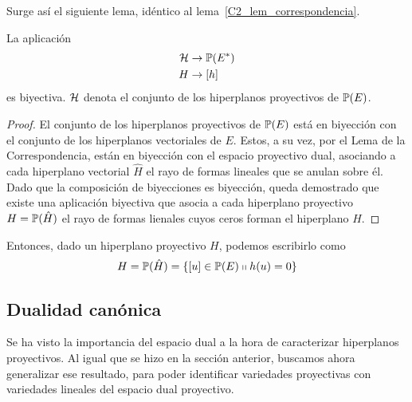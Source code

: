 Surge así el siguiente lema, idéntico al lema~\ref{C2_lem_correspondencia}.
\begin{lem}
	\label{C2_lem_correspondenciaProy}
	La aplicación
	\begin{equation*}
		\begin{split}
			\mathcal{H}& \rightarrow \mathbb{P}(E^*)\\
			H &\rightarrow [h]
		\end{split}
	\end{equation*}
	es biyectiva. $\mathcal{H}$ denota el conjunto de los hiperplanos proyectivos de $\mathbb{P}(E)$.
\end{lem}
\begin{proof}
	El conjunto de los hiperplanos proyectivos de $\mathbb{P}(E)$ está en biyección con el conjunto de los hiperplanos vectoriales de $E$. Estos, a su vez, por el Lema de la Correspondencia, están en biyección con el espacio proyectivo dual, asociando a cada hiperplano vectorial $\hat{H}$ el rayo de formas lineales que se anulan sobre él. Dado que la composición de biyecciones es biyección, queda demostrado que existe una aplicación biyectiva que asocia a cada hiperplano proyectivo $H=\mathbb{P}(\hat{H})$ el rayo de formas lienales cuyos ceros forman el hiperplano  $\hat{H}$.
\end{proof}
Entonces, dado un hiperplano proyectivo $H$, podemos escribirlo como
\begin{equation}
H=\mathbb{P}(\hat{H})=\{[u]\in\mathbb{P}(E)\shortparallel h(u)=0\}
\end{equation}

\subsection{Dualidad canónica}
Se ha visto la importancia del espacio dual a la hora de caracterizar hiperplanos proyectivos. Al igual que se hizo en la sección anterior, buscamos ahora generalizar ese resultado, para poder identificar variedades proyectivas con variedades lineales del espacio dual proyectivo.

